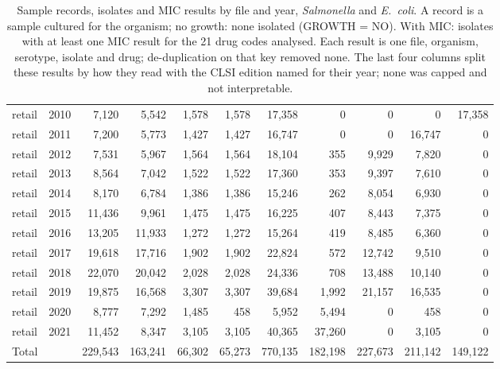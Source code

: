 \begin{table}[h]
\begin{tabular}{llrrrrrrrrr}
retail & 2010 & 7,120 & 5,542 & 1,578 & 1,578 & 17,358 & 0 & 0 & 0 & 17,358 \\
retail & 2011 & 7,200 & 5,773 & 1,427 & 1,427 & 16,747 & 0 & 0 & 16,747 & 0 \\
retail & 2012 & 7,531 & 5,967 & 1,564 & 1,564 & 18,104 & 355 & 9,929 & 7,820 & 0 \\
retail & 2013 & 8,564 & 7,042 & 1,522 & 1,522 & 17,360 & 353 & 9,397 & 7,610 & 0 \\
retail & 2014 & 8,170 & 6,784 & 1,386 & 1,386 & 15,246 & 262 & 8,054 & 6,930 & 0 \\
retail & 2015 & 11,436 & 9,961 & 1,475 & 1,475 & 16,225 & 407 & 8,443 & 7,375 & 0 \\
retail & 2016 & 13,205 & 11,933 & 1,272 & 1,272 & 15,264 & 419 & 8,485 & 6,360 & 0 \\
retail & 2017 & 19,618 & 17,716 & 1,902 & 1,902 & 22,824 & 572 & 12,742 & 9,510 & 0 \\
retail & 2018 & 22,070 & 20,042 & 2,028 & 2,028 & 24,336 & 708 & 13,488 & 10,140 & 0 \\
retail & 2019 & 19,875 & 16,568 & 3,307 & 3,307 & 39,684 & 1,992 & 21,157 & 16,535 & 0 \\
retail & 2020 & 8,777 & 7,292 & 1,485 & 458 & 5,952 & 5,494 & 0 & 458 & 0 \\
retail & 2021 & 11,452 & 8,347 & 3,105 & 3,105 & 40,365 & 37,260 & 0 & 3,105 & 0 \\
Total &  & 229,543 & 163,241 & 66,302 & 65,273 & 770,135 & 182,198 & 227,673 & 211,142 & 149,122 \\
\bottomrule
\end{tabular}
\caption{Sample records, isolates and MIC results by file and year, \textit{Salmonella} and \textit{E.~coli}. A record is a sample cultured for the organism; no growth: none isolated (GROWTH = NO). With MIC: isolates with at least one MIC result for the 21 drug codes analysed. Each result is one file, organism, serotype, isolate and drug; de-duplication on that key removed none. The last four columns split these results by how they read with the CLSI edition named for their year; none was capped and not interpretable.}
\end{table}

